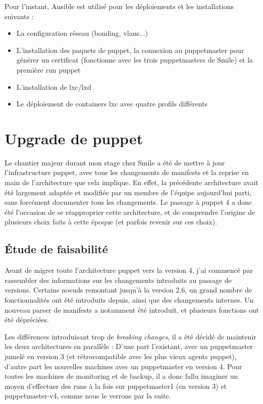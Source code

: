 \documentclass[14 pt]{extreport}
\begin{document}
Pour l'instant, Ansible est utilisé pour les déploiements et les installations suivants :

\begin{itemize}
	\item La configuration réseau (bonding, vlans...)
	\item L'installation des paquets de puppet, la connexion au puppetmaster pour générer un certificat (fonctionne avec les trois puppetmasters de Smile) et la première run puppet
	\item L'installation de lxc/lxd
	\item Le déploiement de containers lxc avec quatre profils différents
\end{itemize}

\section{Upgrade de puppet}

Le chantier majeur durant mon stage chez Smile a été de mettre à jour l'infrastructure puppet, avec tous les changements de manifests et la reprise en main de l'architecture que cela implique. En effet, la précédente architecture avait été largement adaptée et modifiée par un membre de l'équipe aujourd'hui parti, sans forcément documenter tous les changements. Le passage à puppet 4 a donc été l'occasion de se réapproprier cette architecture, et de comprendre l'origine de plusieurs choix faits à cette époque (et parfois revenir sur ces choix).

\subsection{Étude de faisabilité}

Avant de migrer toute l'architecture puppet vers la version 4, j'ai commencé par rassembler des informations sur les changements introduits au passage de versions. Certains noeuds remontant jusqu'à la version 2.6, un grand nombre de fonctionnalités ont été introduits depuis, ainsi que des changements internes. Un nouveau parser de manifests a notamment été introduit, et plusieurs fonctions ont été dépréciées.

Les différences introduisant trop de \emph{breaking changes}, il a été décidé de maintenir les deux architectures en parallèle : D'une part l'existant, avec un puppetmaster jumelé en version 3 (et rétrocompatible avec les plus vieux agents puppet), d'autre part les nouvelles machines avec un puppetmaster en version 4. Pour toutes les machines de monitoring et de backup, il a donc fallu imaginer un moyen d'effectuer des runs à la fois sur puppetmaster1 (en version 3) et puppetmaster-v4, comme nous le verrons par la suite.
\end{document}
